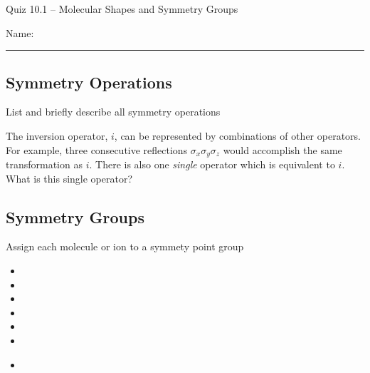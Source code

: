 \documentclass[11pt, letterpaper]{memoir}
\begin{document}
\begin{center}
	{\large Quiz 10.1 -- Molecular Shapes and Symmetry Groups}
\end{center}
{\large Name: \rule[-1mm]{4in}{.1pt}

\subsection*{Symmetry Operations}
List and briefly describe all symmetry operations

\vspace{8em}\noindent
The inversion operator, $i$, can be represented by combinations of other operators. For example, three consecutive reflections $\sigma_x\sigma_y\sigma_z$ would accomplish the same transformation as $i$. There is also one \emph{single} operator which is equivalent to $i$. What is this single operator?

\vspace{3em}\noindent
\subsection*{Symmetry Groups}
Assign each molecule or ion to a symmety point group

\begin{minipage}{0.49\linewidth}
	\begin{itemize}
		\item {}

		      \vspace{3em}
		\item {}

		      \vspace{3em}
		\item {}

		      \vspace{3em}
		\item {}

		      \vspace{3em}
		\item {}

		      \vspace{3em}
		\item {}
	\end{itemize}
\end{minipage}
\begin{minipage}{0.49\linewidth}
	\begin{itemize}
		\item {}


\end{itemize}
\end{minipage}}
\end{document}
